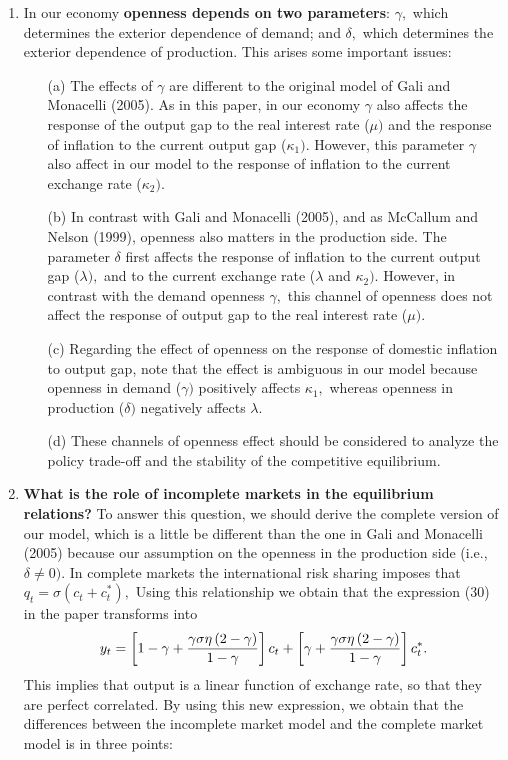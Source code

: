 \documentclass{article}
\begin{document}
\begin{enumerate}
\item In our economy \textbf{openness depends on two parameters}: $\gamma ,$
which determines the exterior dependence of demand; and $\delta ,$ which
determines the exterior dependence of production. This arises some important
issues:

\begin{itemize}
\item[(a)] The effects of $\gamma $ are different to the original model of
Gali and Monacelli (2005). As in this paper, in our economy $\gamma $ also
affects the response of the output gap to the real interest rate ($\mu )$
and the response of inflation to the current output gap ($\kappa _{1}).$
However, this parameter $\gamma $ also affect in our model to the response
of inflation to the current exchange rate ($\kappa _{2}).$

\item[(b)] In contrast with Gali and Monacelli (2005), and as McCallum and
Nelson (1999), openness also matters in the production side. The parameter $%
\delta $ first affects the response of inflation to the current output gap ($%
\lambda ),$ and to the current exchange rate ($\lambda $ and $\kappa _{2}).$
However, in contrast with the demand openness $\gamma ,$ this channel of
openness does not affect the response of output gap to the real interest
rate ($\mu ).$

\item[(c)] Regarding the effect of openness on the response of domestic
inflation to output gap, note that the effect is ambiguous in our model
because openness in demand ($\gamma )$ positively affects $\kappa _{1},$
whereas openness in production ($\delta )$ negatively affects $\lambda .$

\item[(d)] These channels of openness effect should be considered to analyze
the policy trade-off and the stability of the competitive equilibrium.
\end{itemize}

\item \textbf{What is the role of incomplete markets in the equilibrium
relations?} To answer this question, we should derive the complete version
of our model, which is a little be different than the one in Gali and
Monacelli (2005) because our assumption on the openness in the production
side (i.e., $\delta \neq 0).$ In complete markets the international risk
sharing imposes that $q_{t}=\sigma \left( c_{t}+c_{t}^{\ast }\right) ,$
Using this relationship we obtain that the expression (30) in the paper
transforms into%
\begin{equation*}
y_{t}=\left[ 1-\gamma +\frac{\gamma \sigma \eta \left( 2-\gamma \right) }{%
1-\gamma }\right] c_{t}+\left[ \gamma +\frac{\gamma \sigma \eta \left(
2-\gamma \right) }{1-\gamma }\right] c_{t}^{\ast }.
\end{equation*}%
This implies that output is a linear function of exchange rate, so that they
are perfect correlated. By using this new expression, we obtain that the
differences between the incomplete market model and the complete market
model is in three points:


\end{enumerate}
\end{document}
